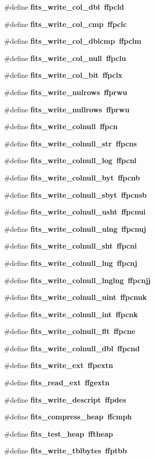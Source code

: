 \begin{CompactItemize}
\item 
\#define \bf{fits\_\-write\_\-col\_\-dbl}~ffpcld
\item 
\#define \bf{fits\_\-write\_\-col\_\-cmp}~ffpclc
\item 
\#define \bf{fits\_\-write\_\-col\_\-dblcmp}~ffpclm
\item 
\#define \bf{fits\_\-write\_\-col\_\-null}~ffpclu
\item 
\#define \bf{fits\_\-write\_\-col\_\-bit}~ffpclx
\item 
\#define \bf{fits\_\-write\_\-nulrows}~ffprwu
\item 
\#define \bf{fits\_\-write\_\-nullrows}~ffprwu
\item 
\#define \bf{fits\_\-write\_\-colnull}~ffpcn
\item 
\#define \bf{fits\_\-write\_\-colnull\_\-str}~ffpcns
\item 
\#define \bf{fits\_\-write\_\-colnull\_\-log}~ffpcnl
\item 
\#define \bf{fits\_\-write\_\-colnull\_\-byt}~ffpcnb
\item 
\#define \bf{fits\_\-write\_\-colnull\_\-sbyt}~ffpcnsb
\item 
\#define \bf{fits\_\-write\_\-colnull\_\-usht}~ffpcnui
\item 
\#define \bf{fits\_\-write\_\-colnull\_\-ulng}~ffpcnuj
\item 
\#define \bf{fits\_\-write\_\-colnull\_\-sht}~ffpcni
\item 
\#define \bf{fits\_\-write\_\-colnull\_\-lng}~ffpcnj
\item 
\#define \bf{fits\_\-write\_\-colnull\_\-lnglng}~ffpcnjj
\item 
\#define \bf{fits\_\-write\_\-colnull\_\-uint}~ffpcnuk
\item 
\#define \bf{fits\_\-write\_\-colnull\_\-int}~ffpcnk
\item 
\#define \bf{fits\_\-write\_\-colnull\_\-flt}~ffpcne
\item 
\#define \bf{fits\_\-write\_\-colnull\_\-dbl}~ffpcnd
\item 
\#define \bf{fits\_\-write\_\-ext}~ffpextn
\item 
\#define \bf{fits\_\-read\_\-ext}~ffgextn
\item 
\#define \bf{fits\_\-write\_\-descript}~ffpdes
\item 
\#define \bf{fits\_\-compress\_\-heap}~ffcmph
\item 
\#define \bf{fits\_\-test\_\-heap}~fftheap
\item 
\#define \bf{fits\_\-write\_\-tblbytes}~ffptbb

\end{CompactItemize}

